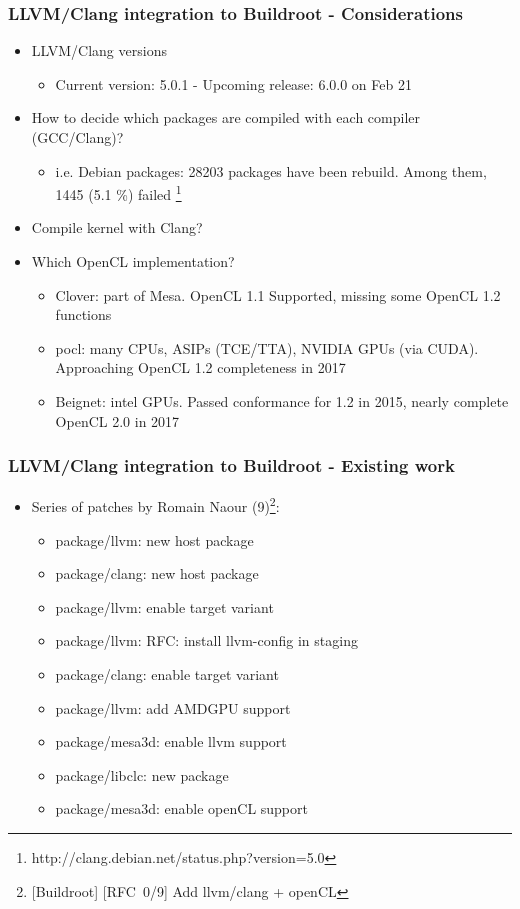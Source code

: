\documentclass{beamer}
\begin{document}
\begin{frame}
\frametitle{LLVM/Clang integration to Buildroot - Considerations}
\begin{itemize}
  \item LLVM/Clang versions
  \begin{itemize}
    \item Current version: 5.0.1 - Upcoming release: 6.0.0 on Feb 21
  \end{itemize}
  \item How to decide which packages are compiled with each compiler (GCC/Clang)?
  \begin{itemize}
    \item i.e. Debian packages: 28203 packages have been rebuild. Among them, 1445 (5.1 \%) failed \footnote{http://clang.debian.net/status.php?version=5.0}
  \end{itemize}
  \item Compile kernel with Clang?
  \item Which OpenCL implementation?
  \begin{itemize}
    \item {\selectfont Clover}: part of Mesa. OpenCL 1.1 Supported, missing some OpenCL 1.2 functions
    \item {\selectfont pocl}: many CPUs, ASIPs (TCE/TTA), NVIDIA GPUs (via CUDA). Approaching OpenCL 1.2 completeness in 2017
    \item {\selectfont Beignet}: intel GPUs. Passed conformance for 1.2 in 2015, nearly complete OpenCL 2.0 in 2017
  \end{itemize}
\end{itemize}
\end{frame}

\begin{frame}
\frametitle{LLVM/Clang integration to Buildroot - Existing work}
\begin{itemize}
  \item Series of patches by Romain Naour (9)\footnote{[Buildroot] [RFC\ 0/9]
  Add llvm/clang + openCL}:
  \begin{itemize}
    \item package/llvm: new host package
    \item package/clang: new host package
    \item package/llvm: enable target variant
    \item package/llvm: RFC: install llvm-config in staging
    \item package/clang: enable target variant
    \item package/llvm: add AMDGPU support
    \item package/mesa3d: enable llvm support
    \item package/libclc: new package
    \item package/mesa3d: enable openCL support
  \end{itemize}
\end{itemize}
\end{frame}
\end{document}
